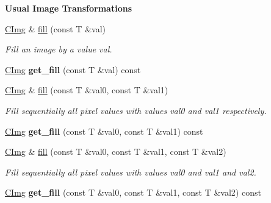 \begin{Indent}{\bf Usual Image Transformations}\par
{\em \label{_amgrpdb6acfbb5e1e3ebe5ea0780f9915e9e6}
 }\begin{DoxyCompactItemize}
\item 
\hyperlink{structcimg__library_1_1_c_img}{CImg} \& \hyperlink{structcimg__library_1_1_c_img_a22c7685eaf6d61e3e25186f702cc89d0}{fill} (const T \&val)
\begin{DoxyCompactList}\small\item\em Fill an image by a value {\ttfamily val}. \item\end{DoxyCompactList}\item 
\hypertarget{structcimg__library_1_1_c_img_a86ebb8e1e47a5cf932e5eb7073ec63ed}{
\hyperlink{structcimg__library_1_1_c_img}{CImg} {\bfseries get\_\-fill} (const T \&val) const }
\label{structcimg__library_1_1_c_img_a86ebb8e1e47a5cf932e5eb7073ec63ed}

\item 
\hyperlink{structcimg__library_1_1_c_img}{CImg} \& \hyperlink{structcimg__library_1_1_c_img_a37dff69737b46ebe38ef21df83ff283c}{fill} (const T \&val0, const T \&val1)
\begin{DoxyCompactList}\small\item\em Fill sequentially all pixel values with values {\itshape val0\/} and {\itshape val1\/} respectively. \item\end{DoxyCompactList}\item 
\hypertarget{structcimg__library_1_1_c_img_a964c30366bdc0dc30bad94a9e8a3c3cb}{
\hyperlink{structcimg__library_1_1_c_img}{CImg} {\bfseries get\_\-fill} (const T \&val0, const T \&val1) const }
\label{structcimg__library_1_1_c_img_a964c30366bdc0dc30bad94a9e8a3c3cb}

\item 
\hyperlink{structcimg__library_1_1_c_img}{CImg} \& \hyperlink{structcimg__library_1_1_c_img_a6fc4d10118a359cd983c75d102b5fea2}{fill} (const T \&val0, const T \&val1, const T \&val2)
\begin{DoxyCompactList}\small\item\em Fill sequentially all pixel values with values {\itshape val0\/} and {\itshape val1\/} and {\itshape val2\/}. \item\end{DoxyCompactList}\item 
\hypertarget{structcimg__library_1_1_c_img_a4576fe753a1e12d75c8cf5c32686688b}{
\hyperlink{structcimg__library_1_1_c_img}{CImg} {\bfseries get\_\-fill} (const T \&val0, const T \&val1, const T \&val2) const }
\label{structcimg__library_1_1_c_img_a4576fe753a1e12d75c8cf5c32686688b}


\end{DoxyCompactItemize}
\end{Indent}
